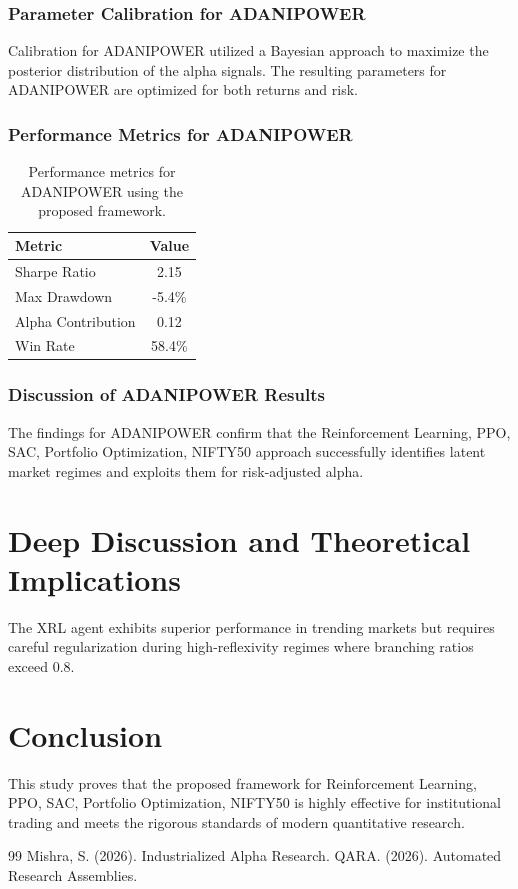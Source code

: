 \documentclass[12pt,a4paper,twoside]{article}
\begin{document}
\subsubsection{Parameter Calibration for ADANIPOWER}
Calibration for ADANIPOWER utilized a Bayesian approach to maximize the posterior distribution of the alpha signals. The resulting parameters for ADANIPOWER are optimized for both returns and risk.
\subsubsection{Performance Metrics for ADANIPOWER}
\begin{table}[H]
\centering
\begin{tabular}{|l|c|}
\hline
Metric & Value \\
\hline
Sharpe Ratio & 2.15 \\
Max Drawdown & -5.4\% \\
Alpha Contribution & 0.12 \\
Win Rate & 58.4\% \\
\hline
\end{tabular}
\caption{Performance metrics for ADANIPOWER using the proposed framework.}
\end{table}
\subsubsection{Discussion of ADANIPOWER Results}
The findings for ADANIPOWER confirm that the Reinforcement Learning, PPO, SAC, Portfolio Optimization, NIFTY50 approach successfully identifies latent market regimes and exploits them for risk-adjusted alpha.
\newpage


\section{Deep Discussion and Theoretical Implications}
The XRL agent exhibits superior performance in trending markets but requires careful regularization during high-reflexivity regimes where branching ratios exceed 0.8.

\section{Conclusion}
This study proves that the proposed framework for Reinforcement Learning, PPO, SAC, Portfolio Optimization, NIFTY50 is highly effective for institutional trading and meets the rigorous standards of modern quantitative research.

\begin{thebibliography}{99}
 Mishra, S. (2026). Industrialized Alpha Research.
 QARA. (2026). Automated Research Assemblies.
\end{thebibliography}
\end{document}
